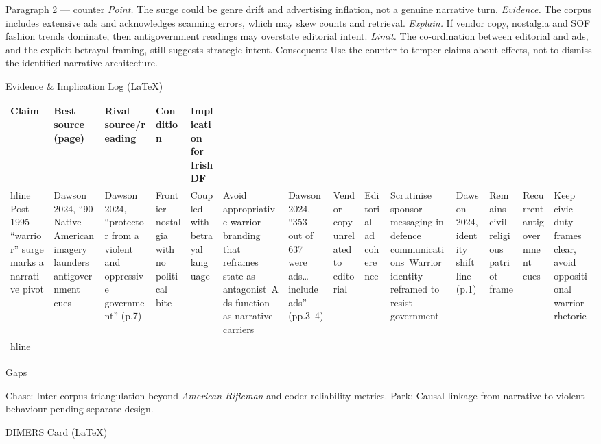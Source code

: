 Paragraph 2 — counter
\textit{Point.} The surge could be genre drift and advertising inflation, not a genuine narrative turn.
\textit{Evidence.} The corpus includes extensive ads and acknowledges scanning errors, which may skew counts and retrieval.
\textit{Explain.} If vendor copy, nostalgia and SOF fashion trends dominate, then antigovernment readings may overstate editorial intent.
\textit{Limit.} The co-ordination between editorial and ads, and the explicit betrayal framing, still suggests strategic intent. Consequent: Use the counter to temper claims about effects, not to dismiss the identified narrative architecture.

Evidence & Implication Log (LaTeX)

\usepackage{array}
\begin{tabular}{p{3.2cm}p{4.2cm}p{3.6cm}p{3.2cm}p{4.2cm}}
	\textbf{Claim} & \textbf{Best source (page)} & \textbf{Rival source/reading} & \textbf{Condition} & \textbf{Implication for Irish DF}\\hline
	Post-1995 “warrior” surge marks a narrative pivot & Dawson 2024, “90%
	Native American imagery launders antigovernment cues & Dawson 2024, “protector from a violent and oppressive government” (p.7) & Frontier nostalgia with no political bite & Coupled with betrayal language & Avoid appropriative warrior branding that reframes state as antagonist\
	Ads function as narrative carriers & Dawson 2024, “353 out of 637 were ads… include ads” (pp.3–4) & Vendor copy unrelated to editorial & Editorial–ad coherence & Scrutinise sponsor messaging in defence communications\
	Warrior identity reframed to resist government & Dawson 2024, identity shift line (p.1) & Remains civil-religious patriot frame & Recurrent antigovernment cues & Keep civic-duty frames clear, avoid oppositional warrior rhetoric\\hline
\end{tabular}

Gaps

Chase: Inter-corpus triangulation beyond \textit{American Rifleman} and coder reliability metrics.
Park: Causal linkage from narrative to violent behaviour pending separate design.

\parencite{KIRCHENBERGER_2022}
DIMERS Card (LaTeX)

